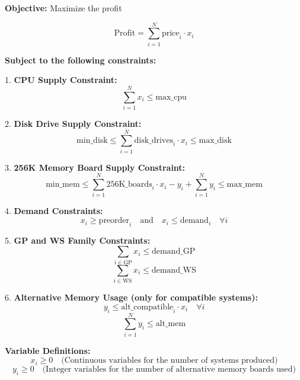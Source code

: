 \documentclass{article}
\begin{document}
\textbf{Objective:}
Maximize the profit

\[
\text{Profit} = \sum_{i=1}^{N} \text{price}_i \cdot x_i
\]

\textbf{Subject to the following constraints:}

1. \textbf{CPU Supply Constraint:}
\[
\sum_{i=1}^{N} x_i \leq \text{max\_cpu}
\]

2. \textbf{Disk Drive Supply Constraint:}
\[
\text{min\_disk} \leq \sum_{i=1}^{N} \text{disk\_drives}_i \cdot x_i \leq \text{max\_disk}
\]

3. \textbf{256K Memory Board Supply Constraint:}
\[
\text{min\_mem} \leq \sum_{i=1}^{N} \text{256K\_boards}_i \cdot x_i - y_i + \sum_{i=1}^{N} y_i \leq \text{max\_mem}
\]

4. \textbf{Demand Constraints:}
\[
x_i \geq \text{preorder}_i \quad \text{and} \quad x_i \leq \text{demand}_i \quad \forall i
\]

5. \textbf{GP and WS Family Constraints:}
\[
\sum_{i \in \text{GP}} x_i \leq \text{demand\_GP}
\]
\[
\sum_{i \in \text{WS}} x_i \leq \text{demand\_WS}
\]

6. \textbf{Alternative Memory Usage (only for compatible systems):}
\[
y_i \leq \text{alt\_compatible}_i \cdot x_i \quad \forall i
\]
\[
\sum_{i=1}^{N} y_i \leq \text{alt\_mem}
\]

\textbf{Variable Definitions:}
\[
x_i \geq 0 \quad \text{(Continuous variables for the number of systems produced)}
\]
\[
y_i \geq 0 \quad \text{(Integer variables for the number of alternative memory boards used)}
\]
\end{document}
